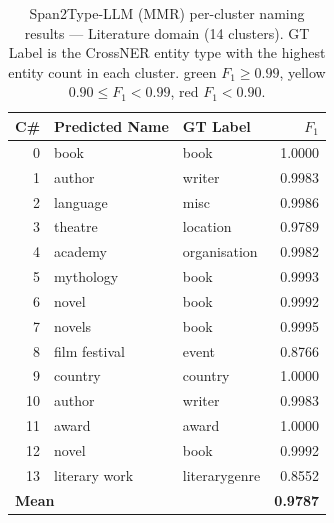 \begin{table}[ht]
\centering
\footnotesize
\caption{Span2Type-LLM (MMR) per-cluster naming results --- Literature domain (14 clusters).
GT Label is the CrossNER entity type with the highest entity count in each cluster.
\colorbox{green!15}{green} $F_1 \geq 0.99$,
\colorbox{yellow!25}{yellow} $0.90 \leq F_1 < 0.99$,
\colorbox{red!15}{red} $F_1 < 0.90$.}
\label{tab:naming_lit_detail}
\setlength{\tabcolsep}{6pt}
\begin{tabular}{r l l r}
\toprule
\textbf{C\#} & \textbf{Predicted Name} & \textbf{GT Label} & \textbf{$F_1$} \\
\midrule
 0 & book          & book          & \cellcolor{green!15}1.0000 \\
 1 & author        & writer        & \cellcolor{green!15}0.9983 \\
 2 & language      & misc          & \cellcolor{green!15}0.9986 \\
 3 & theatre       & location      & \cellcolor{yellow!25}0.9789 \\
 4 & academy       & organisation  & \cellcolor{green!15}0.9982 \\
 5 & mythology     & book          & \cellcolor{green!15}0.9993 \\
 6 & novel         & book          & \cellcolor{green!15}0.9992 \\
 7 & novels        & book          & \cellcolor{green!15}0.9995 \\
 8 & film festival & event         & \cellcolor{red!15}0.8766 \\
 9 & country       & country       & \cellcolor{green!15}1.0000 \\
10 & author        & writer        & \cellcolor{green!15}0.9983 \\
11 & award         & award         & \cellcolor{green!15}1.0000 \\
12 & novel         & book          & \cellcolor{green!15}0.9992 \\
13 & literary work & literarygenre & \cellcolor{red!15}0.8552 \\
\midrule
\multicolumn{3}{l}{\textbf{Mean}} & \textbf{0.9787} \\
\bottomrule
\end{tabular}
\end{table}
